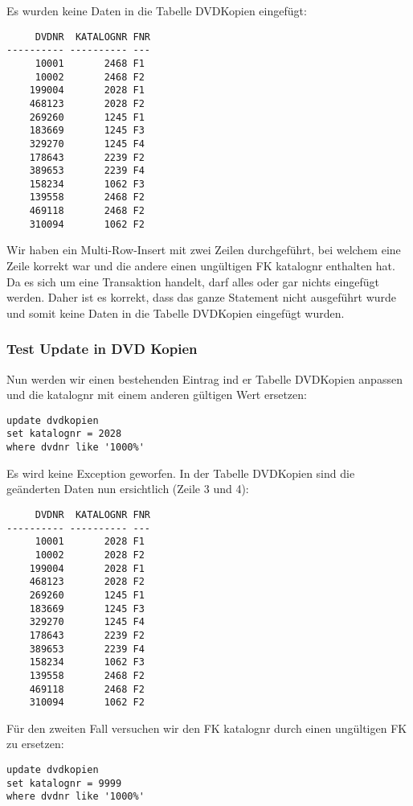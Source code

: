 \documentclass[11pt,a4paper,parskip=half]{scrartcl}
\begin{document}
Es wurden keine Daten in die Tabelle DVDKopien eingefügt:

\begin{lstlisting}
     DVDNR  KATALOGNR FNR
---------- ---------- ---
     10001       2468 F1  
     10002       2468 F2
    199004       2028 F1  
    468123       2028 F2  
    269260       1245 F1  
    183669       1245 F3  
    329270       1245 F4  
    178643       2239 F2  
    389653       2239 F4  
    158234       1062 F3  
    139558       2468 F2  
    469118       2468 F2  
    310094       1062 F2  
\end{lstlisting}

Wir haben ein Multi-Row-Insert mit zwei Zeilen durchgeführt, bei welchem eine Zeile korrekt war und die andere einen ungültigen FK katalognr enthalten hat. Da es sich um eine Transaktion handelt, darf alles oder gar nichts eingefügt werden. Daher ist es korrekt, dass das ganze Statement nicht ausgeführt wurde und somit keine Daten in die Tabelle DVDKopien eingefügt wurden.

\subsubsection{Test Update in DVD Kopien}
Nun werden wir einen bestehenden Eintrag ind er Tabelle DVDKopien anpassen und die katalognr mit einem anderen gültigen Wert ersetzen:

\begin{lstlisting}
update dvdkopien
set katalognr = 2028
where dvdnr like '1000%'
\end{lstlisting}

Es wird keine Exception geworfen. In der Tabelle DVDKopien sind die geänderten Daten nun ersichtlich (Zeile 3 und 4):

\begin{lstlisting}
     DVDNR  KATALOGNR FNR
---------- ---------- ---
     10001       2028 F1  
     10002       2028 F2  
    199004       2028 F1  
    468123       2028 F2  
    269260       1245 F1  
    183669       1245 F3  
    329270       1245 F4  
    178643       2239 F2  
    389653       2239 F4  
    158234       1062 F3  
    139558       2468 F2  
    469118       2468 F2  
    310094       1062 F2  
\end{lstlisting}

Für den zweiten Fall versuchen wir den FK katalognr durch einen ungültigen FK zu ersetzen:

\begin{lstlisting}
update dvdkopien
set katalognr = 9999
where dvdnr like '1000%'
\end{lstlisting}
\end{document}
